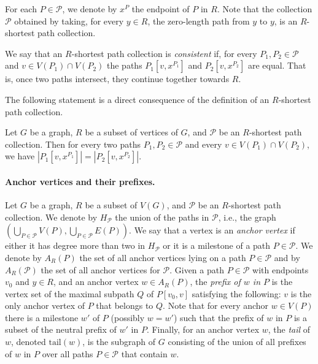 For each $P \in \mathcal{P}$, we denote by $x^P$ the endpoint of $P$ in $R$.
Note that the collection $\mathcal{P}$ obtained by taking, for every $y\in R$, the zero-length path from $y$ to $y$, is an $R$-shortest path collection. 

We say that an $R$-shortest path collection is \emph{consistent} if, for every $P_1,P_2 \in \mathcal{P}$
and $v \in V(P_1) \cap V(P_2)$ the paths $P_1[v,x^{P_1}]$ and $P_2[v,x^{P_2}]$ are equal. That is, 
once two paths intersect, they continue together towards $R$. 

The following statement is a direct consequence of the definition of an $R$-shortest path collection.
\begin{observation}\label{obs:short}
  Let $G$ be a graph, $R$ be a subset of vertices of $G$, and $\mathcal{P}$ be an $R$-shortest path collection. Then for every two paths $P_1,P_2\in \mathcal{P}$ and every $v\in V(P_1)\cap V(P_2)$, we have $|P_1[v,x^{P_1}]|=|P_2[v,x^{P_2}]|$.
\end{observation}

\paragraph{Anchor vertices and their prefixes.}
Let $G$ be a graph, $R$ be a subset of $V(G)$, and $\mathcal{P}$ be an $R$-shortest path collection. We denote by $H_{\mathcal{P}}$ the union of the paths in $\mathcal{P}$, i.e., the graph $(\bigcup_{P\in\mathcal{P}}V(P),\bigcup_{P\in\mathcal{P}}E(P))$.
We say that a vertex is an \emph{anchor vertex} if either it has degree more than two in $H_{\mathcal{P}}$
or it is a milestone of a path $P \in \mathcal{P}$.
We denote by $A_R(P)$ the set of all anchor vertices lying on a path $P \in \mathcal{P}$
and by $A_R(\mathcal{P})$ the set of all anchor vertices for $\mathcal{P}$.
Given a path $P\in\mathcal{P}$ with endpoints $v_0$ and $y\in R$, and an anchor vertex $w\in A_R(P)$,
the \emph{prefix of $w$ in $P$} is the vertex set of the maximal subpath $Q$ of
$P[v_0,v]$ satisfying the following: $v$ is the only anchor vertex of $P$ that belongs to $Q$.
Note that for every anchor $w\in V(P)$ there is a milestone $w'$ of $P$ (possibly $w=w'$)
such that the prefix of $w$ in $P$ is a subset of the neutral prefix of $w'$ in $P$.
Finally, for an anchor vertex $w$, the \emph{tail} of $w$, 
denoted $\mathrm{tail}(w)$, is the subgraph of $G$ consisting
of the union of all prefixes of $w$ in $P$ over all paths $P \in \mathcal{P}$ that contain $w$.

